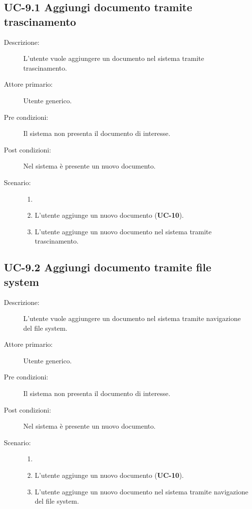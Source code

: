 \subsection{UC-9.1 Aggiungi documento tramite trascinamento}
\begin{description}
    \item[Descrizione:] L'utente vuole aggiungere un documento nel sistema tramite trascinamento.
    \item[Attore primario:] Utente generico.
    \item[Pre condizioni:] Il sistema non presenta il documento di interesse.
    \item[Post condizioni:] Nel sistema è presente un nuovo documento.
    \item[Scenario:] 
    \begin{enumerate}
        \item[]
        \item L’utente aggiunge un nuovo documento (\textbf{UC-10}).
        \item L'utente aggiunge un nuovo documento nel sistema tramite trascinamento.
    \end{enumerate}
\end{description}

\subsection{UC-9.2 Aggiungi documento tramite file system}
\begin{description}
    \item[Descrizione:] L'utente vuole aggiungere un documento nel sistema tramite navigazione del file system.
    \item[Attore primario:] Utente generico.
    \item[Pre condizioni:] Il sistema non presenta il documento di interesse.
    \item[Post condizioni:] Nel sistema è presente un nuovo documento.
    \item[Scenario:]
    \begin{enumerate}
        \item[]
        \item L’utente aggiunge un nuovo documento (\textbf{UC-10}).
        \item L'utente aggiunge un nuovo documento nel sistema tramite navigazione del file system.
    \end{enumerate}
\end{description}

